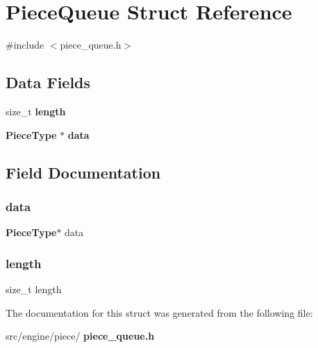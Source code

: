 \section{Piece\+Queue Struct Reference}
\label{structPieceQueue}


{\ttfamily \#include $<$piece\+\_\+queue.\+h$>$}

\subsection*{Data Fields}
\begin{DoxyCompactItemize}
\item 
size\+\_\+t \textbf{ length}
\item 
\textbf{ Piece\+Type} $\ast$ \textbf{ data}
\end{DoxyCompactItemize}


\subsection{Field Documentation}
\mbox{\label{structPieceQueue_aba4149dd7852c6f12ca5b26712592e3c}} 
\subsubsection{data}
{\footnotesize\ttfamily \textbf{ Piece\+Type}$\ast$ data}

\mbox{\label{structPieceQueue_ae809d5359ac030c60a30a8f0b2294b82}} 
\subsubsection{length}
{\footnotesize\ttfamily size\+\_\+t length}



The documentation for this struct was generated from the following file\+:\begin{DoxyCompactItemize}
\item 
src/engine/piece/\textbf{ piece\+\_\+queue.\+h}\end{DoxyCompactItemize}
